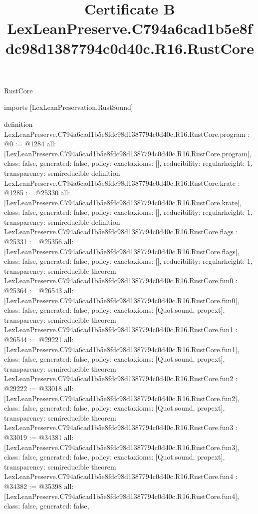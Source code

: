 \begin{lexlean}{RustCore}
\title{Certificate B LexLeanPreserve.C794a6cad1b5e8fdc98d1387794c0d40c.R16.RustCore}
\begin{coremodule}
imports [LexLeanPreservation.RustSound]

definition LexLeanPreserve.C794a6cad1b5e8fdc98d1387794c0d40c.R16.RustCore.program : @0 := @1284 {
  all: [LexLeanPreserve.C794a6cad1b5e8fdc98d1387794c0d40c.R16.RustCore.program],
  class: false,
  generated: false,
  policy: exact{axioms: []},
  reducibility: regular{height: 1},
  transparency: semireducible
}
definition LexLeanPreserve.C794a6cad1b5e8fdc98d1387794c0d40c.R16.RustCore.krate : @1285 := @25330 {
  all: [LexLeanPreserve.C794a6cad1b5e8fdc98d1387794c0d40c.R16.RustCore.krate],
  class: false,
  generated: false,
  policy: exact{axioms: []},
  reducibility: regular{height: 1},
  transparency: semireducible
}
definition LexLeanPreserve.C794a6cad1b5e8fdc98d1387794c0d40c.R16.RustCore.flags : @25331 := @25356 {
  all: [LexLeanPreserve.C794a6cad1b5e8fdc98d1387794c0d40c.R16.RustCore.flags],
  class: false,
  generated: false,
  policy: exact{axioms: []},
  reducibility: regular{height: 1},
  transparency: semireducible
}
theorem LexLeanPreserve.C794a6cad1b5e8fdc98d1387794c0d40c.R16.RustCore.fun0 : @25364 := @26543 {
  all: [LexLeanPreserve.C794a6cad1b5e8fdc98d1387794c0d40c.R16.RustCore.fun0],
  class: false,
  generated: false,
  policy: exact{axioms: [Quot.sound, propext]},
  transparency: semireducible
}
theorem LexLeanPreserve.C794a6cad1b5e8fdc98d1387794c0d40c.R16.RustCore.fun1 : @26544 := @29221 {
  all: [LexLeanPreserve.C794a6cad1b5e8fdc98d1387794c0d40c.R16.RustCore.fun1],
  class: false,
  generated: false,
  policy: exact{axioms: [Quot.sound, propext]},
  transparency: semireducible
}
theorem LexLeanPreserve.C794a6cad1b5e8fdc98d1387794c0d40c.R16.RustCore.fun2 : @29222 := @33018 {
  all: [LexLeanPreserve.C794a6cad1b5e8fdc98d1387794c0d40c.R16.RustCore.fun2],
  class: false,
  generated: false,
  policy: exact{axioms: [Quot.sound, propext]},
  transparency: semireducible
}
theorem LexLeanPreserve.C794a6cad1b5e8fdc98d1387794c0d40c.R16.RustCore.fun3 : @33019 := @34381 {
  all: [LexLeanPreserve.C794a6cad1b5e8fdc98d1387794c0d40c.R16.RustCore.fun3],
  class: false,
  generated: false,
  policy: exact{axioms: [Quot.sound, propext]},
  transparency: semireducible
}
theorem LexLeanPreserve.C794a6cad1b5e8fdc98d1387794c0d40c.R16.RustCore.fun4 : @34382 := @35398 {
  all: [LexLeanPreserve.C794a6cad1b5e8fdc98d1387794c0d40c.R16.RustCore.fun4],
  class: false,
  generated: false,
}
\end{coremodule}
\end{lexlean}
